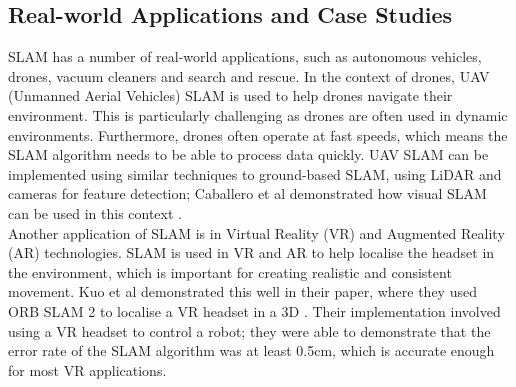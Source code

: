 \documentclass[12pt]{article}
\begin{document}
\subsection{Real-world Applications and Case Studies} %
SLAM has a number of real-world applications, such as autonomous vehicles, drones, vacuum cleaners and search and rescue.
In the context of drones, UAV (Unmanned Aerial Vehicles) SLAM is used to help drones navigate their environment. This is
particularly challenging as drones are often used in dynamic environments. Furthermore, drones often operate at fast speeds,
which means the SLAM algorithm needs to be able to process data quickly. UAV SLAM can be implemented using similar techniques
to ground-based SLAM, using LiDAR and cameras for feature detection; Caballero et al demonstrated how visual SLAM can be used
in this context \cite{UAV_SLAM}.\\
Another application of SLAM is in Virtual Reality (VR) and Augmented Reality (AR) technologies. SLAM is used in VR and AR to
help localise the headset in the environment, which is important for creating realistic and consistent movement. Kuo et al
demonstrated this well in their paper, where they used ORB SLAM 2 to localise a VR headset in a 3D \cite{VR_SLAM}. Their
implementation involved using a VR headset to control a robot; they were able to demonstrate that the error rate of the SLAM
algorithm was at least 0.5cm, which is accurate enough for most VR applications.\\
\end{document}

